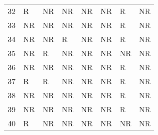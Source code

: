 \begin{tabular}{rlllllll}
32 & R & NR & NR & NR & NR & R & NR \\
33 & NR & NR & NR & NR & NR & R & NR \\
34 & NR & NR & R & NR & NR & R & NR \\
35 & NR & R & NR & NR & NR & NR & NR \\
36 & NR & NR & NR & NR & NR & R & NR \\
37 & R & R & NR & NR & NR & R & NR \\
38 & NR & NR & NR & NR & NR & R & NR \\
39 & NR & NR & NR & NR & NR & R & NR \\
40 & R & NR & NR & NR & NR & NR & NR \\
\bottomrule
\end{tabular}
